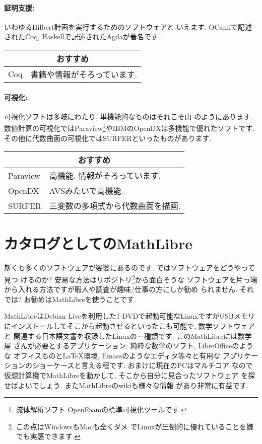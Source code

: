 \documentclass[b5j,8pt,twocolumn]{ltjsarticle}
\begin{document}
\paragraph{証明支援:} いわゆるHilbert計画を実行するためのソフトウェアと
いえます. OCamlで記述されたCoq, Haskellで記述されたAgdaが著名です.

\vspace{0.5cm}
{\footnotesize
\begin{tabularx}{7cm}{l X}
\multicolumn{2}{c}{おすすめ}\\\hline
Coq& 書籍や情報がそろっています.\\\hline
\end{tabularx}
}
\vspace{0.5cm}

\paragraph{可視化:} 可視化ソフトは多岐にわたり, 単機能的なものはそれこそ山
のようにあります. 数値計算の可視化ではParaview\footnote{流体解析ソフト
OpenFoamの標準可視化ツールです.}やIBMのOpenDXは多機能で優れたソフトです.
 その他に代数曲面の可視化ではSURFERといったものがあります.

\vspace{0.5cm}
{\footnotesize
\begin{tabularx}{8cm}{l X}
\multicolumn{2}{c}{おすすめ}\\\hline
Paraview& 高機能. 情報がそろっています.\\
OpenDX& AVSみたいで高機能.\\
SURFER& 三変数の多項式から代数曲面を描画.\\\hline
\end{tabularx}
}
\vspace{0.5cm}

\section{カタログとしてのMathLibre}

斯くも多くのソフトウェアが娑婆にあるのです. ではソフトウェアをどうやって見つ
けるのか? 安易な方法はリポジトリ\footnote{この点はWindowsもMacも全くダメ
でLinuxが圧倒的に優れていることを嫌でも実感できます.}から面白そうな
ソフトウェアを片っ端から入れる方法ですが暇人や調査が趣味/仕事の方にしか勧め
られません. それでは? お勧めはMathLibreを使うことです.
\newline

MathLibreはDebian Liveを利用した1-DVDで起動可能なLinuxですがUSBメモリ
にインストールしてそこから起動させるといったこも可能で, 数学ソフトウェアと
関連する日本語文書を収録したLinuxの一種類です. このMathLibreには数学屋
さんが必要とするアプリケーション: 純粋な数学のソフト, LibreOfficeのような
オフィスものと{\LaTeX}環境,  Emacsのようなエディタ等々と有用な
アプリケーションのショーケースと言える程です. おまけに現在のPCはマルチコア
なので仮想計算機でMathLibreを動かして, そこから自分に見合ったソフトウェア
を探せばよいでしょう. またMathLibre\cite{MathLibre}のwikiも様々な情報
があり非常に有益です.
\end{document}
